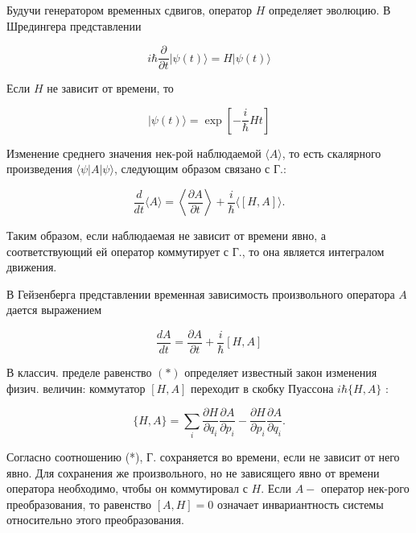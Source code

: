 \documentclass[10pt]{article}
\begin{document}
Будучи генератором временных сдвигов, оператор $H$ определяет эволюцию. В Шредингера представлении



\[

i \hbar \frac{\partial}{\partial t}|\psi(t)\rangle=H|\psi(t)\rangle

\]



Если $H$ не зависит от времени, то



\[

|\psi(t)\rangle=\exp \left[-\frac{i}{\hbar} H t\right]

\]



Изменение среднего значения нек-рой наблюдаемой $\langle A\rangle$, то есть скалярного произведения $\langle\psi|A| \psi\rangle$, следующим образом связано с Г.:



\[

\frac{d}{d t}\langle A\rangle=\left\langle\frac{\partial A}{\partial t}\right\rangle+\frac{i}{\hbar}\langle[H, A]\rangle .

\]



Таким образом, если наблюдаемая не зависит от времени явно, а соответствующий ей оператор коммутирует с Г., то она является интегралом движения.



В Гейзенберга представлении временная зависимость произвольного оператора $A$ дается выражением



\[

\frac{d A}{d t}=\frac{\partial A}{\partial t}+\frac{i}{\hbar}[H, A]

\]



В классич. пределе равенство $(*)$ определяет известный закон изменения физич. величин: коммутатор $[H, A]$ переходит в скобку Пуассона $i \hbar\{H, A\}$ :



\[

\{H, A\}=\sum_{i} \frac{\partial H}{\partial q_{i}} \frac{\partial A}{\partial p_{i}}-\frac{\partial H}{\partial p_{i}} \frac{\partial A}{\partial q_{i}} .

\]



Согласно соотношению (*), Г. сохраняется во времени, если не зависит от него явно. Для сохранения же произвольного, но не зависящего явно от времени оператора необходимо, чтобы он коммутировал с $H$. Если $A-$ оператор нек-рого преобразования, то равенство $[A, H]=0$ означает инвариантность системы относительно этого преобразования.
\end{document}
